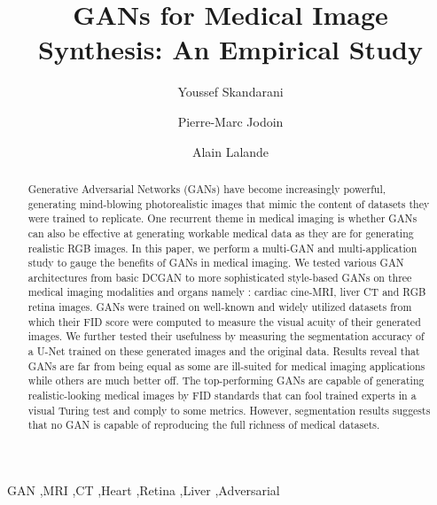 \documentclass[preprint,12pt, authoryear]{elsarticle}
\begin{document}
\begin{frontmatter}





\title{GANs for Medical Image Synthesis: An Empirical Study}



\author[inst1,inst2]{Youssef Skandarani}
\author[inst3]{Pierre-Marc Jodoin}
\author[inst1,inst4]{Alain Lalande}





\begin{abstract}
Generative Adversarial Networks (GANs) have become increasingly powerful, generating mind-blowing photorealistic images that mimic the content of datasets they were trained to replicate.  One recurrent theme in medical imaging is whether GANs can also be effective at generating workable medical data as they are for generating realistic RGB images.  In this paper, we perform a multi-GAN and multi-application study to gauge the benefits of GANs in medical imaging.  We tested various GAN architectures from basic DCGAN to more sophisticated style-based GANs on three medical imaging modalities and organs namely : cardiac cine-MRI, liver CT and RGB retina images. GANs were trained on well-known and widely utilized datasets from which their FID score were computed to measure the visual acuity of their generated images. We further tested their usefulness by measuring the segmentation accuracy of a U-Net trained on these generated images and the original data.  
 Results reveal that GANs are far from being equal as some are ill-suited for medical imaging applications while others are much better off.  The top-performing GANs are capable of generating realistic-looking medical images by FID standards that can fool trained experts in a visual Turing test and comply to some metrics.  However, segmentation results suggests that no GAN is capable of reproducing the full richness of medical datasets.
\end{abstract}





\begin{keyword}
GAN \sep MRI \sep CT \sep Heart \sep Retina \sep Liver \sep Adversarial
\end{keyword}

\end{frontmatter}
\end{document}
